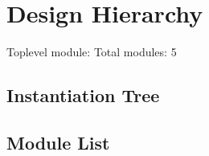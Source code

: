\documentclass[letterpaper,10pt,english]{sphinxmanual}
\begin{document}
\sphinxstepscope


\chapter{Design Hierarchy}
\label{\detokenize{hierarchy:design-hierarchy}}\label{\detokenize{hierarchy::doc}}
\sphinxAtStartPar
Top\sphinxhyphen{}level module: 
Total modules: 5


\section{Instantiation Tree}
\label{\detokenize{hierarchy:instantiation-tree}}


\section{Module List}
\label{\detokenize{hierarchy:module-list}}
\end{document}
